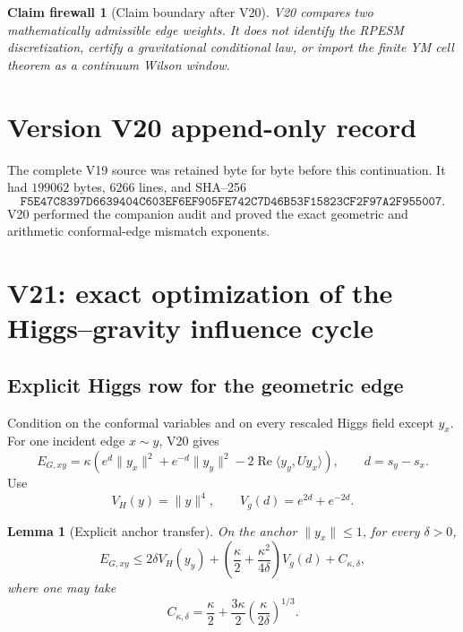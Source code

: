 \documentclass[11pt]{article}
\newtheorem{lemma}[theorem]{Lemma}
\newtheorem{firewall}[theorem]{Claim firewall}
\theoremstyle{remark}
\begin{document}
\begin{firewall}[Claim boundary after V20]
\label{fire:v17v20}
V20 compares two mathematically admissible edge weights.  It does
not identify the RPESM discretization, certify a gravitational
conditional law, or import the finite YM cell theorem as a
continuum Wilson window.
\end{firewall}

\section*{Version V20 append-only record}
The complete V19 source was retained byte for byte before this
continuation.  It had \(199062\) bytes, \(6266\) lines, and SHA--256
\[
 \texttt{F5E47C8397D6639404C603EF6EF905FE742C7D46B53F15823CF2F97A2F955007}.
\]
V20 performed the companion audit and proved the exact geometric
and arithmetic conformal-edge mismatch exponents.


\section{V21: exact optimization of the Higgs--gravity influence cycle}
\label{sec:v17v21}

\subsection{Explicit Higgs row for the geometric edge}

Condition on the conformal variables and on every rescaled Higgs
field except \(y_x\).  For one incident edge \(x\sim y\), V20 gives
\[
 E_{G,xy}
 =\kappa\left(
 e^d\|y_x\|^2+e^{-d}\|y_y\|^2
 -2\operatorname{Re}\langle y_y,Uy_x\rangle
 \right),
 \qquad d=s_y-s_x.                                 \tag{21.1}
\]
Use
\[
 V_H(y)=\|y\|^4,\qquad
 V_g(d)=e^{2d}+e^{-2d}.                            \tag{21.2}
\]

\begin{lemma}[Explicit anchor transfer]
\label{lem:v17v21-anchor}
On the anchor \(\|y_x\|\leq1\), for every \(\delta>0\),
\[
 E_{G,xy}
 \leq
 2\delta V_H(y_y)
 +\left(\frac\kappa2+\frac{\kappa^2}{4\delta}\right)V_g(d)
 +C_{\kappa,\delta},                               \tag{21.3}
\]
where one may take
\[
 C_{\kappa,\delta}
 =\frac\kappa2+
 \frac{3\kappa}{2}
 \left(\frac{\kappa}{2\delta}\right)^{1/3}.         \tag{21.4}
\]
\end{lemma}
\end{document}
